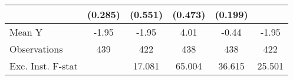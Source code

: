 {\begin{tabular}{l*{5}{c}}
            &     (0.285)         &     (0.551)         &     (0.473)         &     (0.199)         &                     \\
\midrule
Mean Y      &       -1.95         &       -1.95         &        4.01         &       -0.44         &       -1.95         \\
Observations&         439         &         422         &         438         &         438         &         422         \\
Exc. Inst. F-stat&                     &      17.081         &      65.004         &      36.615         &      25.501         \\
\bottomrule
\end{tabular}
}
